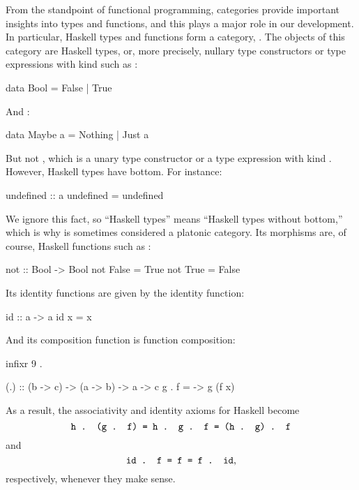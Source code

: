 From the standpoint of functional programming, categories provide
important insights into types and functions, and this plays a major
role in our development. In particular, Haskell types and functions
form a category, \hask. The objects of this category are Haskell
types, or, more precisely, nullary type constructors or type
expressions with kind \texthaskell{*} such as :
\begin{codehaskell}
data Bool = False | True
\end{codehaskell}
And :
\begin{codehaskell}
data Maybe a = Nothing | Just a
\end{codehaskell}
But not , which is a unary type constructor or a
type expression with kind \texthaskell{* -> *}. However, Haskell types
have bottom. For instance:
\begin{codehaskell}
undefined :: a
undefined = undefined
\end{codehaskell}
We ignore this fact, so ``Haskell types'' means ``Haskell types
without bottom,'' which is why \hask is sometimes considered a
platonic category. Its morphisms are, of course, Haskell functions
such as :
\begin{codehaskell}
not :: Bool -> Bool
not False = True
not True  = False
\end{codehaskell}
Its identity functions are given by the identity function:
\begin{codehaskell}
id :: a -> a
id x = x
\end{codehaskell}
And its composition function is function composition:
\begin{codehaskell}
infixr 9 .

(.) :: (b -> c) -> (a -> b) -> a -> c
g . f = \x -> g (f x)
\end{codehaskell}
As a result, the associativity and identity axioms for Haskell become
\begin{equation}
  \label{eq:hask-associativity}
  \text{\texttt{h . (g . f) = h . g . f = (h . g) . f}}
\end{equation}
and
\begin{equation}
  \label{eq:hask-identity}
  \text{\texttt{id . f = f = f . id}}
  \text{,}
\end{equation}
respectively, whenever they make sense.

